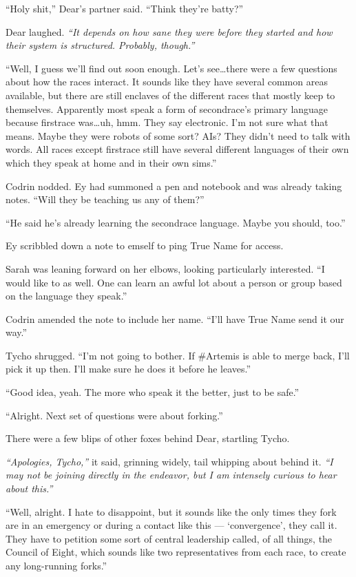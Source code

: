 ``Holy shit,'' Dear's partner said. ``Think they're batty?''

Dear laughed. \emph{``It depends on how sane they were before they started and how their system is structured. Probably, though.''}

``Well, I guess we'll find out soon enough. Let's see\ldots there were a few questions about how the races interact. It sounds like they have several common areas available, but there are still enclaves of the different races that mostly keep to themselves. Apparently most speak a form of secondrace's primary language because firstrace was\ldots uh, hmm. They say electronic. I'm not sure what that means. Maybe they were robots of some sort? AIs? They didn't need to talk with words. All races except firstrace still have several different languages of their own which they speak at home and in their own sims.''

Codrin nodded. Ey had summoned a pen and notebook and was already taking notes. ``Will they be teaching us any of them?''

``He said he's already learning the secondrace language. Maybe you should, too.''

Ey scribbled down a note to emself to ping True Name for access.

Sarah was leaning forward on her elbows, looking particularly interested. ``I would like to as well. One can learn an awful lot about a person or group based on the language they speak.''

Codrin amended the note to include her name. ``I'll have True Name send it our way.''

Tycho shrugged. ``I'm not going to bother. If \#Artemis is able to merge back, I'll pick it up then. I'll make sure he does it before he leaves.''

``Good idea, yeah. The more who speak it the better, just to be safe.''

``Alright. Next set of questions were about forking.''

There were a few blips of other foxes behind Dear, startling Tycho.

\emph{``Apologies, Tycho,''} it said, grinning widely, tail whipping about behind it. \emph{``I may not be joining directly in the endeavor, but I am intensely curious to hear about this.''}

``Well, alright. I hate to disappoint, but it sounds like the only times they fork are in an emergency or during a contact like this --- `convergence', they call it. They have to petition some sort of central leadership called, of all things, the Council of Eight, which sounds like two representatives from each race, to create any long-running forks.''

